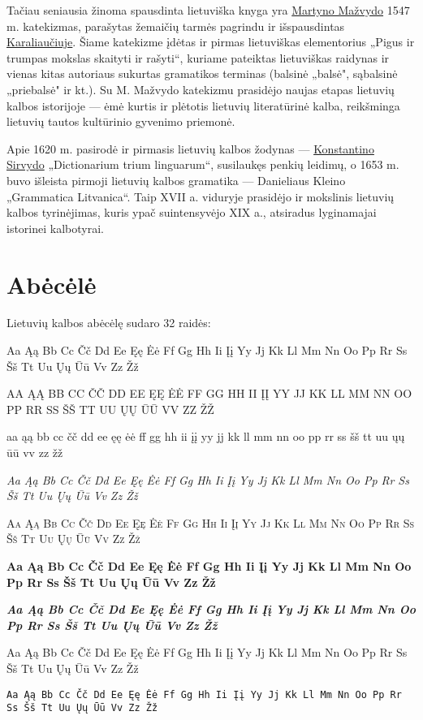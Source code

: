 \documentclass[a4paper]{article}
\begin{document}
Tačiau seniausia žinoma spausdinta lietuviška knyga yra 
\href{http://lt.wikipedia.org/wiki/Martynas_Ma%C5%BEvydas}{Martyno Mažvydo} 1547 m. katekizmas, parašytas 
žemaičių tarmės pagrindu ir išspausdintas 
\href{http://lt.wikipedia.org/wiki/Kaliningradas}{Karaliaučiuje}. Šiame katekizme įdėtas ir pirmas lietuviškas 
elementorius „Pigus ir trumpas mokslas skaityti ir rašyti“, kuriame pateiktas lietuviškas raidynas ir vienas 
kitas autoriaus sukurtas gramatikos terminas (balsinė „balsė", sąbalsinė „priebalsė" ir kt.). 
Su M. Mažvydo katekizmu prasidėjo naujas etapas lietuvių kalbos istorijoje — ėmė kurtis ir plėtotis 
lietuvių literatūrinė kalba, reikšminga lietuvių tautos kultūrinio gyvenimo priemonė.

Apie 1620 m. pasirodė ir pirmasis lietuvių kalbos žodynas — 
\href{http://lt.wikipedia.org/wiki/Konstantinas_Sirvydas}{Konstantino Sirvydo} „Dictionarium trium linguarum“, 
susilaukęs penkių leidimų, o 1653 m. buvo išleista pirmoji lietuvių kalbos gramatika — Danieliaus Kleino 
„Grammatica Litvanica“. Taip XVII a. viduryje prasidėjo ir mokslinis lietuvių kalbos tyrinėjimas, kuris 
ypač suintensyvėjo XIX a., atsiradus lyginamajai istorinei kalbotyrai.

\section{Abėcėlė}

Lietuvių kalbos abėcėlę sudaro 32 raidės:

Aa Ąą Bb Cc Čč Dd Ee Ęę Ėė Ff Gg Hh Ii Įį Yy Jj Kk Ll Mm Nn Oo Pp Rr Ss Šš Tt Uu Ųų Ūū Vv Zz Žž

\MakeUppercase{Aa Ąą Bb Cc Čč Dd Ee Ęę Ėė Ff Gg Hh Ii Įį Yy Jj Kk Ll Mm Nn Oo Pp Rr Ss Šš Tt Uu Ųų Ūū Vv Zz Žž}

\MakeLowercase{Aa Ąą Bb Cc Čč Dd Ee Ęę Ėė Ff Gg Hh Ii Įį Yy Jj Kk Ll Mm Nn Oo Pp Rr Ss Šš Tt Uu Ųų Ūū Vv Zz Žž}

\textit{Aa Ąą Bb Cc Čč Dd Ee Ęę Ėė Ff Gg Hh Ii Įį Yy Jj Kk Ll Mm Nn Oo Pp Rr Ss Šš Tt Uu Ųų Ūū Vv Zz Žž}

\textsc{Aa Ąą Bb Cc Čč Dd Ee Ęę Ėė Ff Gg Hh Ii Įį Yy Jj Kk Ll Mm Nn Oo Pp Rr Ss Šš Tt Uu Ųų Ūū Vv Zz Žž}

{\selectfont{Aa Ąą Bb Cc Čč Dd Ee Ęę Ėė Ff Gg Hh Ii Įį Yy Jj Kk Ll Mm Nn Oo Pp Rr Ss Šš Tt Uu Ųų Ūū Vv Zz Žž}}

\textbf{Aa Ąą Bb Cc Čč Dd Ee Ęę Ėė Ff Gg Hh Ii Įį Yy Jj Kk Ll Mm Nn Oo Pp Rr Ss Šš Tt Uu Ųų Ūū Vv Zz Žž}

\textbf{\textit{Aa Ąą Bb Cc Čč Dd Ee Ęę Ėė Ff Gg Hh Ii Įį Yy Jj Kk Ll Mm Nn Oo Pp Rr Ss Šš Tt Uu Ųų Ūū Vv Zz Žž}}

\textsf{Aa Ąą Bb Cc Čč Dd Ee Ęę Ėė Ff Gg Hh Ii Įį Yy Jj Kk Ll Mm Nn Oo Pp Rr Ss Šš Tt Uu Ųų Ūū Vv Zz Žž}

\texttt{Aa Ąą Bb Cc Čč Dd Ee Ęę Ėė Ff Gg Hh Ii Įį Yy Jj Kk Ll Mm Nn Oo Pp Rr Ss Šš Tt Uu Ųų Ūū Vv Zz Žž}
\end{document}
